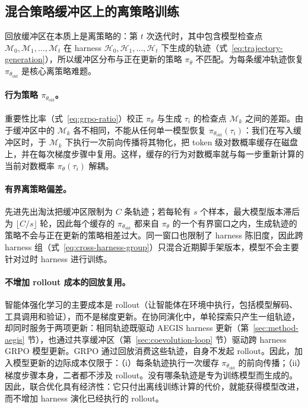 \subsection{混合策略缓冲区上的离策略训练}
\label{sec:coevolution-offpolicy}

回放缓冲区在本质上是离策略的：第 $t$ 次迭代时，其中包含模型检查点 $\mathcal{M}_0,\mathcal{M}_1,\ldots,\mathcal{M}_t$ 在 harness $\mathcal{H}_0,\mathcal{H}_1,\ldots,\mathcal{H}_t$ 下生成的轨迹（式~\ref{eq:trajectory-generation}），所以缓冲区分布与正在更新的策略 $\pi_\theta$ 不匹配。为每条缓冲轨迹恢复 $\pi_{\theta_{\text{old}}}$ 是核心离策略难题。

\paragraph{行为策略 $\pi_{\theta_{\text{old}}}$。}
重要性比率（式~\ref{eq:grpo-ratio}）校正 $\pi_\theta$ 与生成 $\tau_i$ 的检查点 $\mathcal{M}_k$ 之间的差距。由于缓冲区中的 $\mathcal{M}_k$ 各不相同，不能从任何单一模型恢复 $\pi_{\theta_{\text{old}}}(\tau_i)$：我们在写入缓冲区时，于 $\mathcal{M}_k$ 下执行一次前向传播将其物化，把 token 级对数概率缓存在磁盘上，并在每次梯度步骤中复用。这样，缓存的行为对数概率就与每一步重新计算的当前对数概率 $\pi_\theta(\tau_i)$ 解耦。

\paragraph{有界离策略偏差。}
先进先出淘汰把缓冲区限制为 $C$ 条轨迹；若每轮有 $s$ 个样本，最大模型版本滞后为 $\lfloor C/s\rfloor$ 轮，因此每个缓存的 $\pi_{\theta_{\text{old}}}$ 都来自 $\pi_\theta$ 的一个有界窗口之内，生成轨迹的策略不会与正在更新的策略相差过大。同一窗口也限制了 harness 陈旧度，因此跨 harness 组（式~\ref{eq:cross-harness-group}）只混合近期脚手架版本，模型不会主要针对过时 harness 进行训练。

\paragraph{不增加 rollout 成本的回放复用。}
智能体强化学习的主要成本是 rollout（让智能体在环境中执行，包括模型解码、工具调用和验证），而不是梯度更新。在协同演化中，单轮探索只产生一组轨迹，却同时服务于两项更新：相同轨迹既驱动 AEGIS harness 更新（第~\ref{sec:method-aegis} 节），也通过共享缓冲区（第~\ref{sec:coevolution-loop} 节）驱动跨 harness GRPO 模型更新。GRPO 通过回放消费这些轨迹，自身不发起 rollout。因此，加入模型更新的边际成本仅限于：（i）每条轨迹执行一次缓存 $\pi_{\theta_{\text{old}}}$ 的前向传播；（ii）梯度步骤本身，二者都不涉及 rollout。没有哪条轨迹是专为训练模型而生成的。因此，联合优化具有经济性：它只付出离线训练计算的代价，就能获得模型改进，而不增加 harness 演化已经执行的 rollout。

